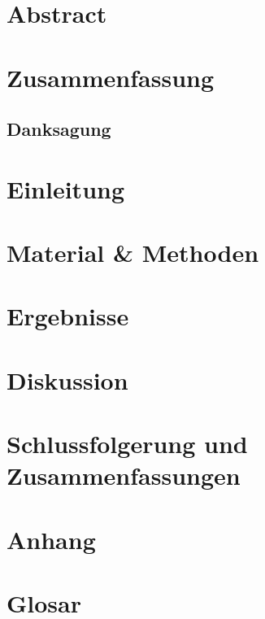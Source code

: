 \documentclass[11pt]{article}
\begin{document}
    \pagebreak
    \begin{Abstract}
        \section*{Abstract}
        
        \section*{Zusammenfassung}
        
    \end{Abstract}
    
    \pagebreak
    
    \begin{thanknote}
        \section*{Danksagung}
        
    \end{thanknote}
    
    \pagebreak
    
    \tableofcontents
    
    \pagebreak
    
    \section{Einleitung}
        
    
    \section{Material \& Methoden}
        
       
    \section{Ergebnisse}
        
    
    \section{Diskussion}
        
    
    \section{Schlussfolgerung und Zusammenfassungen}
        
    \pagebreak
    
    \annex
    \section{Anhang}
        
        
    \section{Glosar}
        
    
    \printbibliography[title={Referenzen}]
        
\end{document}
